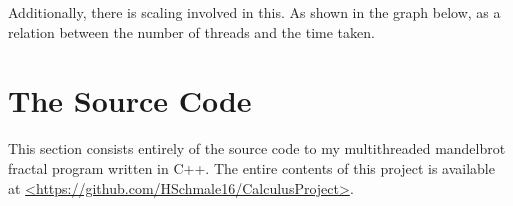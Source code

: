 \documentclass[10pt,oneside,letter]{article}
\begin{document}
Additionally, there is scaling involved in this. As shown in the graph
below, as a relation between the number of threads and the time taken.


\section{The Source Code}
This section consists entirely of the source code to my multithreaded
mandelbrot fractal program written in C++. The entire contents of this
project is available at 
\url{<https://github.com/HSchmale16/CalculusProject>}.

\end{document}
